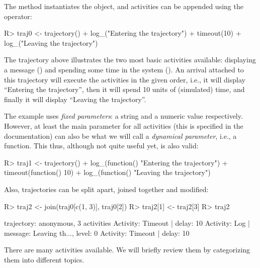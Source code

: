 \documentclass[
  nojss]{jss}
\begin{document}
The  method instantiates the object, and activities
can be appended using the \code{\%>\%} operator:

\begin{CodeChunk}
\begin{CodeInput}
R> traj0 <- trajectory() %
+   log_("Entering the trajectory") %
+   timeout(10) %
+   log_("Leaving the trajectory")
\end{CodeInput}
\end{CodeChunk}

The trajectory above illustrates the two most basic activities
available: displaying a message () and spending some time
in the system (). An arrival attached to this trajectory
will execute the activities in the given order, i.e., it will display
``Entering the trajectory'', then it will spend 10 units of (simulated)
time, and finally it will display ``Leaving the trajectory''.

The example uses \emph{fixed parameters}: a string and a numeric value
respectively. However, at least the main parameter for all activities
(this is specified in the documentation) can also be what we will call a
\emph{dynamical parameter}, i.e., a function. This thus, although not
quite useful yet, is also valid:

\begin{CodeChunk}
\begin{CodeInput}
R> traj1 <- trajectory() %
+   log_(function() "Entering the trajectory") %
+   timeout(function() 10) %
+   log_(function() "Leaving the trajectory")
\end{CodeInput}
\end{CodeChunk}

Also, trajectories can be split apart, joined together and modified:

\begin{CodeChunk}
\begin{CodeInput}
R> traj2 <- join(traj0[c(1, 3)], traj0[2])
R> traj2[1] <- traj2[3]
R> traj2
\end{CodeInput}
\begin{CodeOutput}
trajectory: anonymous, 3 activities
{ Activity: Timeout      | delay: 10 }
{ Activity: Log          | message: Leaving th..., level: 0 }
{ Activity: Timeout      | delay: 10 }
\end{CodeOutput}
\end{CodeChunk}

There are many activities available. We will briefly review them by
categorizing them into different topics.
\end{document}
